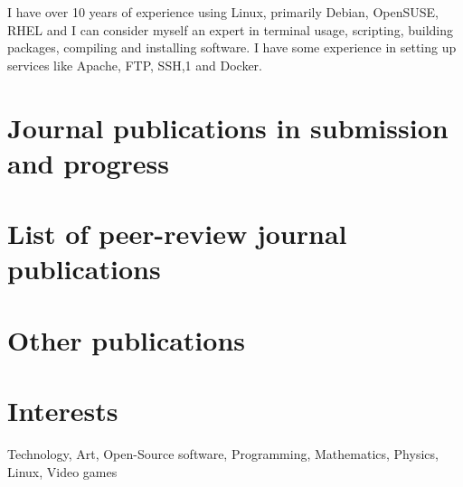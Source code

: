 \documentclass[a4paper,10pt]{article} %
\begin{document}
{I have over 10 years of experience using Linux, primarily Debian, OpenSUSE, RHEL and I can consider myself an expert in terminal usage, scripting, building packages, compiling and installing software.
I have some experience in setting up services like Apache, FTP, SSH,1 and Docker.


\section{Journal publications in submission and progress}






\section{List of peer-review journal publications}




\section{Other publications}








\section{Interests}

Technology, Art, Open-Source software, Programming, Mathematics, Physics, Linux, Video games


}
\end{document}
